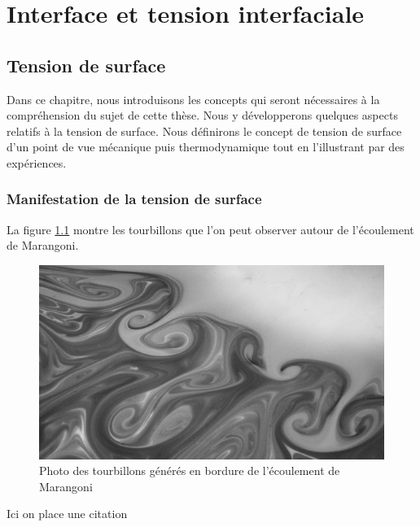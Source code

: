 \part{Interface et tension interfaciale}

\chapter{Tension de surface}

Dans ce chapitre, nous introduisons les concepts qui seront nécessaires à la compréhension du sujet de cette thèse. Nous y développerons quelques aspects relatifs à la tension de surface. Nous définirons le concept de tension de surface d'un point de vue mécanique  puis thermodynamique tout en l'illustrant par des expériences. 

\section{Manifestation de la tension de surface}

La figure \ref{fig:TourbillonsDeMarangoni} montre les tourbillons que l'on peut observer autour de l'écoulement de Marangoni.

\begin{figure}[!ht]
  \centering
  \includegraphics*[scale = 1]{./figures/chap1/Tourbillons_Marangoni.png}
  \caption{Photo des tourbillons générés en bordure de l'écoulement de Marangoni}
  \label{fig:TourbillonsDeMarangoni}
\end{figure}

Ici on place une citation 

